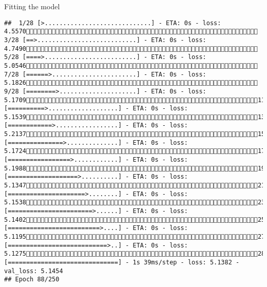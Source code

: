 \documentclass[
  ignorenonframetext,
]{beamer}
\begin{document}
\begin{frame}[fragile]{Fitting the model}
\begin{verbatim}
##  1/28 [>.............................] - ETA: 0s - loss: 4.5570 3/28 [==>...........................] - ETA: 0s - loss: 4.7490 5/28 [====>.........................] - ETA: 0s - loss: 5.0546 7/28 [======>.......................] - ETA: 0s - loss: 5.1826 9/28 [========>.....................] - ETA: 0s - loss: 5.170911/28 [==========>...................] - ETA: 0s - loss: 5.153913/28 [============>.................] - ETA: 0s - loss: 5.213715/28 [===============>..............] - ETA: 0s - loss: 5.172417/28 [=================>............] - ETA: 0s - loss: 5.198819/28 [===================>..........] - ETA: 0s - loss: 5.134721/28 [=====================>........] - ETA: 0s - loss: 5.153823/28 [=======================>......] - ETA: 0s - loss: 5.140225/28 [=========================>....] - ETA: 0s - loss: 5.119527/28 [===========================>..] - ETA: 0s - loss: 5.127528/28 [==============================] - 1s 39ms/step - loss: 5.1382 - val_loss: 5.1454
## Epoch 88/250

\end{verbatim}
\end{frame}
\end{document}
